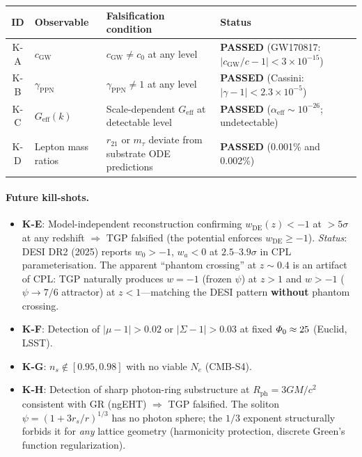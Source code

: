 \begin{center}\small
\begin{tabular}{@{}clp{5.5cm}l@{}}
\toprule
\textbf{ID} & \textbf{Observable} & \textbf{Falsification condition} &
\textbf{Status} \\
\midrule
K-A & $c_{\mathrm{GW}}$
  & $c_{\mathrm{GW}} \neq c_{0}$ at any level
  & \textbf{PASSED} (GW170817: $|c_{\mathrm{GW}}/c-1|<3\times 10^{-15}$) \\[4pt]
K-B & $\gamma_{\mathrm{PPN}}$
  & $\gamma_{\mathrm{PPN}} \neq 1$ at any level
  & \textbf{PASSED} (Cassini: $|\gamma-1|<2.3\times 10^{-5}$) \\[4pt]
K-C & $G_{\mathrm{eff}}(k)$
  & Scale-dependent $G_{\mathrm{eff}}$ at detectable level
  & \textbf{PASSED} ($\alpha_{\mathrm{eff}}\sim 10^{-26}$; undetectable) \\[4pt]
K-D & Lepton mass ratios
  & $r_{21}$ or $m_{\tau}$ deviate from substrate ODE predictions
  & \textbf{PASSED} (0.001\% and 0.002\%) \\
\bottomrule
\end{tabular}
\end{center}

\paragraph{Future kill-shots.}
\begin{itemize}[nosep]
  \item \textbf{K-E}: Model-independent reconstruction confirming
        $w_{\mathrm{DE}}(z)<-1$ at $>5\sigma$ at any redshift
        $\Rightarrow$ TGP falsified
        (the potential enforces $w_{\mathrm{DE}}\geq -1$).
        \emph{Status}: DESI DR2 (2025) reports $w_0 > -1$,
        $w_a < 0$ at $2.5$--$3.9\sigma$ in CPL parameterisation.
        The apparent ``phantom crossing'' at $z \sim 0.4$ is
        an artifact of CPL: TGP naturally produces $w = -1$
        (frozen $\psi$) at $z > 1$ and $w > -1$ ($\psi \to 7/6$
        attractor) at $z < 1$---matching the DESI pattern
        \textbf{without} phantom crossing.
  \item \textbf{K-F}: Detection of $|\mu-1|>0.02$ or
        $|\Sigma-1|>0.03$ at fixed $\varPhi_0\approx 25$
        (Euclid, LSST).
  \item \textbf{K-G}: $n_{s}\notin[0.95,0.98]$ with no viable
        $N_{e}$ (CMB-S4).
  \item \textbf{K-H}: Detection of sharp photon-ring substructure
        at $R_{\mathrm{ph}} = 3GM/c^{2}$ consistent with GR
        (ngEHT) $\Rightarrow$ TGP falsified.  The soliton
        $\psi = (1+3r_{s}/r)^{1/3}$ has no photon sphere; the
        $1/3$ exponent structurally forbids it for \emph{any}
        lattice geometry (harmonicity protection, discrete
        Green's function regularization).
\end{itemize}

